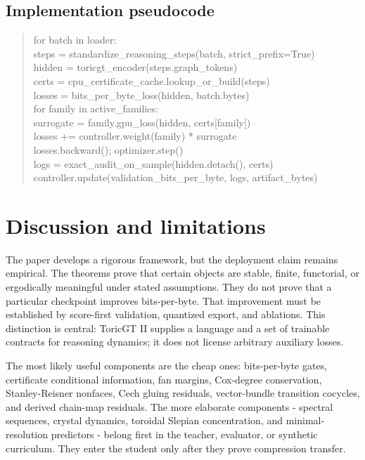 \documentclass[10pt]{article}
\numberwithin{equation}{section}
\begin{document}
\subsection{Implementation pseudocode}
\begin{quote}\small\ttfamily
for batch in loader:\\
\quad steps = standardize\_reasoning\_steps(batch, strict\_prefix=True)\\
\quad hidden = toricgt\_encoder(steps.graph\_tokens)\\
\quad certs = cpu\_certificate\_cache.lookup\_or\_build(steps)\\
\quad losses = bits\_per\_byte\_loss(hidden, batch.bytes)\\
\quad for family in active\_families:\\
\quad\quad surrogate = family.gpu\_loss(hidden, certs[family])\\
\quad\quad losses += controller.weight(family) * surrogate\\
\quad losses.backward(); optimizer.step()\\
\quad logs = exact\_audit\_on\_sample(hidden.detach(), certs)\\
\quad controller.update(validation\_bits\_per\_byte, logs, artifact\_bytes)
\end{quote}

\section{Discussion and limitations}
The paper develops a rigorous framework, but the deployment claim remains empirical. The theorems prove that certain objects are stable, finite, functorial, or ergodically meaningful under stated assumptions. They do not prove that a particular checkpoint improves bits-per-byte. That improvement must be established by score-first validation, quantized export, and ablations. This distinction is central: ToricGT II supplies a language and a set of trainable contracts for reasoning dynamics; it does not license arbitrary auxiliary losses.

The most likely useful components are the cheap ones: bits-per-byte gates, certificate conditional information, fan margins, Cox-degree conservation, Stanley-Reisner nonfaces, Cech gluing residuals, vector-bundle transition cocycles, and derived chain-map residuals. The more elaborate components - spectral sequences, crystal dynamics, toroidal Slepian concentration, and minimal-resolution predictors - belong first in the teacher, evaluator, or synthetic curriculum. They enter the student only after they prove compression transfer.
\end{document}

